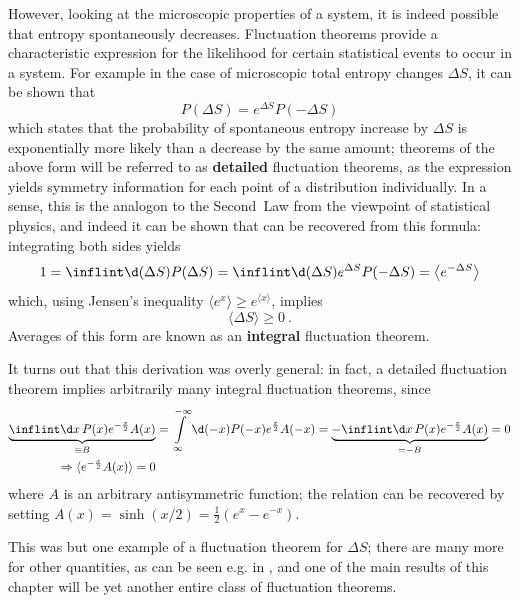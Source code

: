 However, looking at the microscopic properties of a system, it is indeed possible that entropy spontaneously decreases. Fluctuation theorems provide a characteristic expression for the likelihood for certain statistical events to occur in a system. For example in the case of microscopic total entropy changes \(\Delta S\), it can be shown that
%
\begin{equation}
	P(\Delta S) = e^{\Delta S}P(-\Delta S)
\end{equation}
%
which states that the probability of spontaneous entropy increase by \(\Delta S\) is exponentially more likely than a decrease by the same amount; theorems of the above form will be referred to as \textbf{detailed} fluctuation theorems, as the expression yields symmetry information for each point of a distribution individually. In a sense, this is the analogon to the Second~Law from the viewpoint of statistical physics, and indeed it can be shown that  can be recovered from this formula: integrating both sides yields
%
\begin{equation}
	\label{eqn:average of exp}
	1 = \inflint \d (\Delta S) P(\Delta S) = \inflint \d (\Delta S) e^{\Delta S}P(-\Delta S) = \left\langle e^{-\Delta S} \right\rangle
\end{equation}
%
which, using Jensen's inequality \(\langle e^x\rangle \geq e^{\langle x\rangle}\), implies
%
\begin{equation}
	\langle\Delta S\rangle \geq 0 ~.
\end{equation}
%
Averages of this form are known as an \textbf{integral} fluctuation theorem.

It turns out that this derivation was overly general: in fact, a detailed fluctuation theorem implies arbitrarily many integral fluctuation theorems, since
%
\begin{align}
	\notag
	   \underbrace{\inflint\d x \, P(x) e^{-\frac x2}A(x)}_{\equiv B}
	&= \int\limits_\infty^{-\infty}\d(-x) P(-x) e^{\frac x2}A(-x)
	 = \underbrace{- \inflint\d x \, P(x) e^{-\frac x2}A(x)}_{= -B}
	 = 0
	\\
	\label{eqn:antisymmetric exp average}
	\Rightarrow
	\langle e^{-\frac x2}A(x)\rangle = 0
\end{align}
%
where \(A\) is an arbitrary antisymmetric function; the relation  can be recovered by setting \(A(x) = \sinh(x/2) = \frac12(e^x-e^{-x})\).

This was but one example of a fluctuation theorem for \(\Delta S\); there are many more for other quantities, as can be seen e.g. in \cite{seifert-review}, and one of the main results of this chapter will be yet another entire class of fluctuation theorems.



